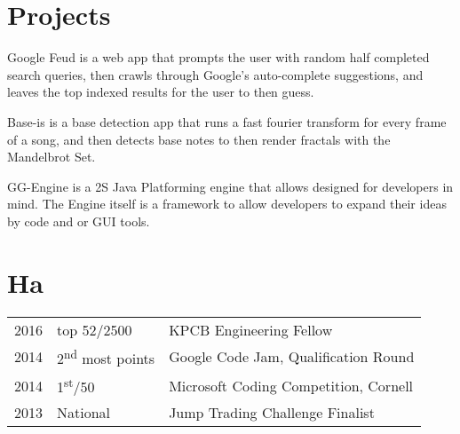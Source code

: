 \documentclass[]{deedy-resume-openfont}
\begin{document}
\begin{minipage}[t]{0.66\textwidth}
\section{Projects}
Google Feud is a web app that prompts the user with random half completed search queries, then crawls through Google's auto-complete suggestions, and leaves the top indexed results for the user to then guess. 
\sectionsep

Base-is is a base detection app that runs a fast fourier transform for every frame of a song, and then detects base notes to then render fractals with the Mandelbrot Set. 
\sectionsep

GG-Engine is a 2S Java Platforming engine that allows designed for developers in mind. The Engine itself is a framework to allow developers to expand their ideas by code and or GUI tools.
\sectionsep


\section{Ha} 
\begin{tabular}{rll}
2016	     & top 52/2500  & KPCB Engineering Fellow\\
2014	     & 2\textsuperscript{nd} most points  & Google Code Jam, Qualification Round\\
2014	     & 1\textsuperscript{st}/50  & Microsoft Coding Competition, Cornell\\
2013	     & National  & Jump Trading Challenge Finalist\\


\end{tabular}
\sectionsep

\end{minipage} 
\end{document}
